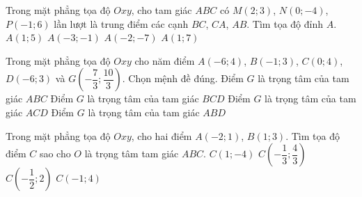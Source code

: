 \begin{ex}%
	Trong mặt phẳng tọa độ $Oxy$, cho tam giác $ABC$ có $M(2;3)$, $N(0;-4)$, $P(-1;6)$ lần lượt là trung điểm các cạnh $BC$, $CA$, $AB$. Tìm tọa độ đỉnh $A$.
	\choice
	{$A(1;5)$}
	{\True $A(-3;-1)$}
	{$A(-2;-7)$}
	{$A(1;7)$}
\end{ex}

\begin{ex}%
	Trong mặt phẳng tọa độ $Oxy$ cho năm điểm $A(-6;4)$, $B(-1;3)$, $C(0;4)$, $D(-6;3)$ và $G\left(-\dfrac{7}{3};\dfrac{10}{3}\right)$. Chọn mệnh đề đúng.
	\choice
	{Điểm $G$ là trọng tâm của tam giác $ABC$}
	{\True Điểm $G$ là trọng tâm của tam giác $BCD$}
	{Điểm $G$ là trọng tâm của tam giác $ACD$}
	{Điểm $G$ là trọng tâm của tam giác $ABD$}
\end{ex}

\begin{ex}%
	Trong mặt phẳng tọa độ $Oxy$, cho hai điểm $A(-2;1)$, $B(1;3)$. Tìm tọa độ điểm $C$ sao cho $O$ là trọng tâm tam giác $ABC$.
	\choice
	{\True $C(1;-4)$}
	{$C\left( -\dfrac{1}{3};\dfrac{4}{3} \right)$}
	{$C\left( -\dfrac{1}{2};2 \right)$}
	{$C(-1;4)$}
\end{ex}

